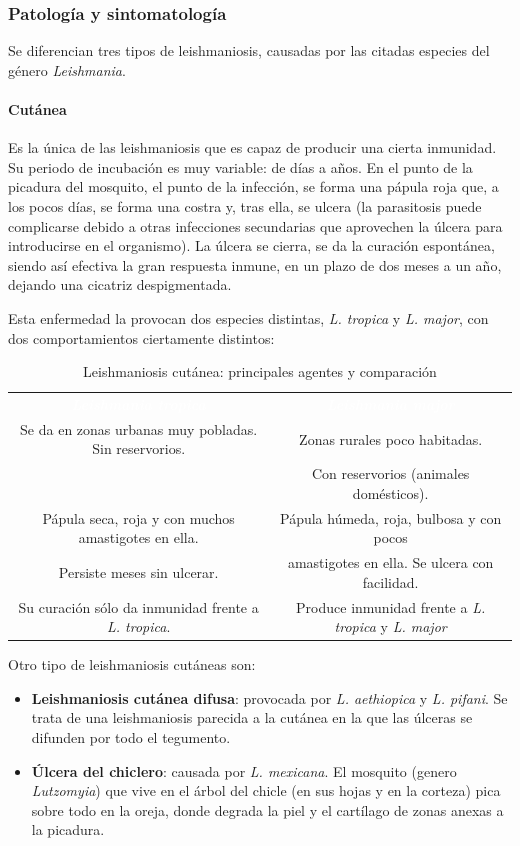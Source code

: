 \subsubsection{Patología y sintomatología}
Se diferencian tres tipos de leishmaniosis, causadas por las citadas especies del género \textit{Leishmania}.
\paragraph{Cutánea}
Es la única de las leishmaniosis que es capaz de producir una cierta inmunidad. Su periodo de incubación es muy variable: de días a años. En el punto de la picadura del mosquito, el punto de la infección, se forma una pápula roja que, a los pocos días, se forma una costra y, tras ella, se ulcera (la parasitosis puede complicarse debido a otras infecciones secundarias que aprovechen la úlcera para introducirse en el organismo). La úlcera se cierra, se da la curación espontánea, siendo así efectiva la gran respuesta inmune, en un plazo de dos meses a un año, dejando una cicatriz despigmentada.

Esta enfermedad la provocan dos especies distintas, \textit{L. tropica} y \textit{L. major}, con dos comportamientos ciertamente distintos:
\begin{table}[H]
	\centering
	\begin{tabular}{cc}
		\rowcolor{black}\textcolor{white}{\textit{\textbf{Leishmania tropica}}}&\textcolor{white}{\textit{\textbf{Leishmania major}}}\\
		Se da en zonas urbanas muy pobladas. Sin reservorios.&Zonas rurales poco habitadas.\\
		&Con reservorios (animales domésticos).\\
		\rowcolor{hiperlightgray}Pápula seca, roja y con muchos amastigotes en ella.&Pápula húmeda, roja, bulbosa y con pocos\\
		\rowcolor{hiperlightgray} Persiste meses sin ulcerar.& amastigotes en ella. Se ulcera con facilidad.\\
		Su curación sólo da inmunidad frente a \textit{L. tropica}.&Produce inmunidad frente a\textit{ L. tropica} y \textit{L. major}\\
		\hline
	\end{tabular}
	\caption{Leishmaniosis cutánea: principales agentes y comparación}
\end{table}

Otro tipo de leishmaniosis cutáneas son:
\begin{itemize}[itemsep=0pt,parsep=0pt,topsep=0pt,partopsep=0pt]
	\item \textbf{Leishmaniosis cutánea difusa}: provocada por \textit{L. aethiopica} y \textit{L. pifani}. Se trata de una leishmaniosis parecida a la cutánea en la que las úlceras se difunden por todo el tegumento.
	\item\textbf{Úlcera del chiclero}: causada por \textit{L. mexicana}. El mosquito (genero \textit{Lutzomyia}) que vive en el árbol del chicle (en sus hojas y en la corteza) pica sobre todo en la oreja, donde degrada la piel y el cartílago de zonas anexas a la picadura.
\end{itemize}
